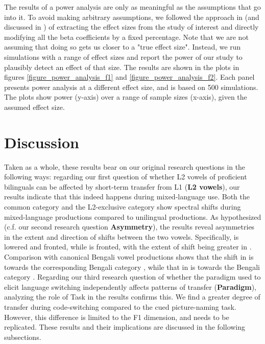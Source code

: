 \documentclass[12 pt]{article}
\newcommand{\nt}[1]{\textipa{[#1]}} %
\begin{document}
The results of a power analysis are only as meaningful as the assumptions that go into it. To avoid making arbitrary assumptions, we followed the approach in \cite{brysbaert2018power} (and discussed in \cite{kumle2021estimating}) of extracting the effect sizes from the study of interest and directly modifying all the beta coefficients by a fixed percentage. Note that we are not assuming that doing so gets us closer to a "true effect size". Instead, we run simulations with a range of effect sizes and report the power of our study to plausibly detect an effect of that size. The results are shown in the plots in figures \ref{figure_power_analysis_f1} and \ref{figure_power_analysis_f2}. Each panel presents power analysis at a different effect size, and is based on 500 simulations. The plots show power (y-axis) over a range of sample sizes (x-axis), given the assumed effect size.   


\section{Discussion}

Taken as a whole, these results bear on our original research questions in the following ways: regarding our first question of whether L2 vowels of proficient bilinguals can be affected by short-term transfer from L1 (\textbf{L2 vowels}), our results indicate that this indeed happens during mixed-language use. Both the common category \nt{\ae} and the L2-exclusive category \nt{2} show spectral shifts during mixed-language productions compared to unilingual productions. As hypothesized (c.f. our second research question \textbf{Asymmetry}), the results reveal asymmetries in the extent and direction of shifts between the two vowels. Specifically, \nt{2} is lowered and fronted, while \nt{\ae} is fronted, with the extent of shift being greater in \nt{2}. Comparison with canonical Bengali vowel productions shows that the shift in \nt{\ae} is towards the corresponding Bengali category \nt{\ae}, while that in \nt{2} is towards the Bengali category \nt{a:}. Regarding our third research question of whether the paradigm used to elicit language switching independently affects patterns of transfer (\textbf{Paradigm}), analyzing the role of Task in the results confirms this. We find a greater degree of transfer during code-switching compared to the cued picture-naming task. However, this difference is limited to the F1 dimension, and needs to be replicated. These results and their implications are discussed in the following subsections.
\end{document}
